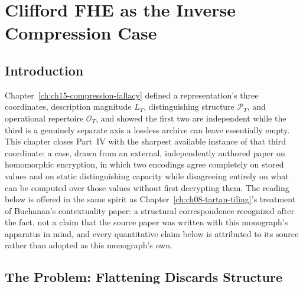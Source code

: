 
\chapter{Clifford FHE as the Inverse Compression Case}
\label{ch:ch18-clifford-fhe}
\section{Introduction}

Chapter~\ref{ch:ch15-compression-fallacy} defined a representation's three coordinates, description magnitude $L_T$, distinguishing structure $\mathcal{P}_T$, and operational repertoire $\mathcal{O}_T$, and showed the first two are independent while the third is a genuinely separate axis a lossless archive can leave essentially empty. This chapter closes Part~IV with the sharpest available instance of that third coordinate: a case, drawn from an external, independently authored paper on homomorphic encryption, in which two encodings agree completely on stored values and on static distinguishing capacity while disagreeing entirely on what can be computed over those values without first decrypting them. The reading below is offered in the same spirit as Chapter~\ref{ch:ch08-tartan-tiling}'s treatment of Buchanan's contextuality paper: a structural correspondence recognized after the fact, not a claim that the source paper was written with this monograph's apparatus in mind, and every quantitative claim below is attributed to its source rather than adopted as this monograph's own.

\section{The Problem: Flattening Discards Structure}

